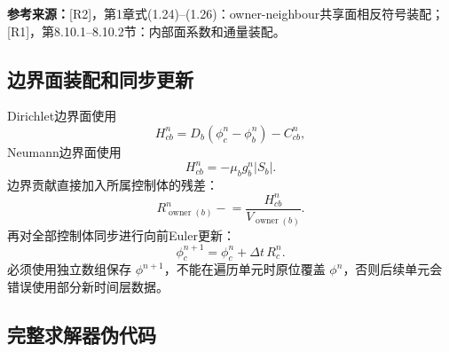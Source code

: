 \documentclass[UTF8,12pt,a4paper]{ctexart}
\numberwithin{equation}{section}
\newcommand{\Rone}{\textnormal{[R1]}}
\newcommand{\Rtwo}{\textnormal{[R2]}}
\newcommand{\source}[1]{%
  \par\smallskip
  \noindent\colorbox{sourcebg}{%
    \parbox{0.955\linewidth}{\raggedright\footnotesize\color{sourcegray}\textbf{参考来源：}#1}%
  }
  \par\smallskip
}
\begin{document}
\source{\Rtwo，第1章式(1.24)--(1.26)：owner-neighbour共享面相反符号装配；\Rone，第8.10.1--8.10.2节：内部面系数和通量装配。}

\subsection{边界面装配和同步更新}

Dirichlet边界面使用
\begin{equation}
  H_{cb}^n=D_b(\phi_c^n-\phi_b^n)
  -C_{cb}^n,
  \label{eq:algorithm_dirichlet}
\end{equation}
Neumann边界面使用
\begin{equation}
  H_{cb}^n=-\mu_bg_b^n|S_b|.
  \label{eq:algorithm_neumann}
\end{equation}
边界贡献直接加入所属控制体的残差：
\begin{equation}
  R_{\operatorname{owner}(b)}^n
  \mathrel{-}=
  \frac{H_{cb}^n}{V_{\operatorname{owner}(b)}}.
  \label{eq:algorithm_boundary_residual}
\end{equation}
再对全部控制体同步进行向前Euler更新：
\begin{equation}
  \boxed{
  \phi_c^{n+1}
  =\phi_c^n+\Delta t\,R_c^n}.
  \label{eq:algorithm_update}
\end{equation}
必须使用独立数组保存 $\phi^{n+1}$，不能在遍历单元时原位覆盖 $\phi^n$，否则后续单元会错误使用部分新时间层数据。

\subsection{完整求解器伪代码}
\end{document}

